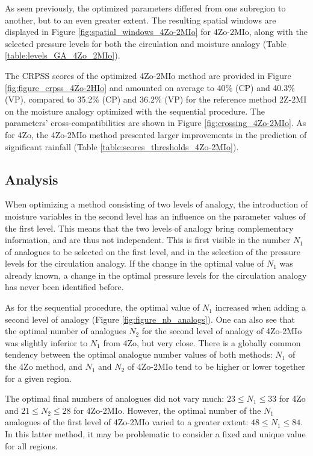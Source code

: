 \documentclass[review]{elsarticle}
\begin{document}
As seen previously, the optimized parameters differed from one subregion to another, but to an even greater extent. The resulting spatial windows are displayed in Figure \ref{fig:spatial_windows_4Zo-2MIo} for 4Zo-2MIo, along with the selected pressure levels for both the circulation and moisture analogy (Table \ref{table:levels_GA_4Zo_2MIo}). 

The CRPSS scores of the optimized 4Zo-2MIo method are provided in Figure \ref{fig:figure_crpss_4Zo-2HIo} and amounted on average to 40\% (CP) and 40.3\% (VP), compared to 35.2\% (CP) and 36.2\% (VP) for the reference method 2Z-2MI on the moisture analogy optimized with the sequential procedure. The parameters’ cross-compatibilities are shown in Figure \ref{fig:crossing_4Zo-2MIo}. As for 4Zo, the 4Zo-2MIo method presented larger improvements in the prediction of significant rainfall (Table \ref{table:scores_thresholds_4Zo-2MIo}).


\subsection{Analysis}

When optimizing a method consisting of two levels of analogy, the introduction of moisture variables in the second level has an influence on the parameter values of the first level. This means that the two levels of analogy bring complementary information, and are thus not independent. This is first visible in the number $N_{1}$ of analogues to be selected on the first level, and in the selection of the pressure levels for the circulation analogy. If the change in the optimal value of $N_{1}$ was already known, a change in the optimal pressure levels for the circulation analogy has never been identified before.

As for the sequential procedure, the optimal value of $N_{1}$ increased when adding a second level of analogy (Figure \ref{fig:figure_nb_analogs}). One can also see that the optimal number of analogues $N_{2}$ for the second level of analogy of 4Zo-2MIo was slightly inferior to $N_{1}$ from 4Zo, but very close. There is a globally common tendency between the optimal analogue number values of both methods: $N_{1}$ of the 4Zo method, and $N_{1}$ and $N_{2}$ of 4Zo-2MIo tend to be higher or lower together for a given region.

The optimal final numbers of analogues did not vary much: $23 \leq N_{1} \leq 33$ for 4Zo and $21 \leq N_{2} \leq 28$ for 4Zo-2MIo. However, the optimal number of the $N_{1}$ analogues of the first level of 4Zo-2MIo varied to a greater extent: $48 \leq N_{1} \leq 84$. In this latter method, it may be problematic to consider a fixed and unique value for all regions.
\end{document}
